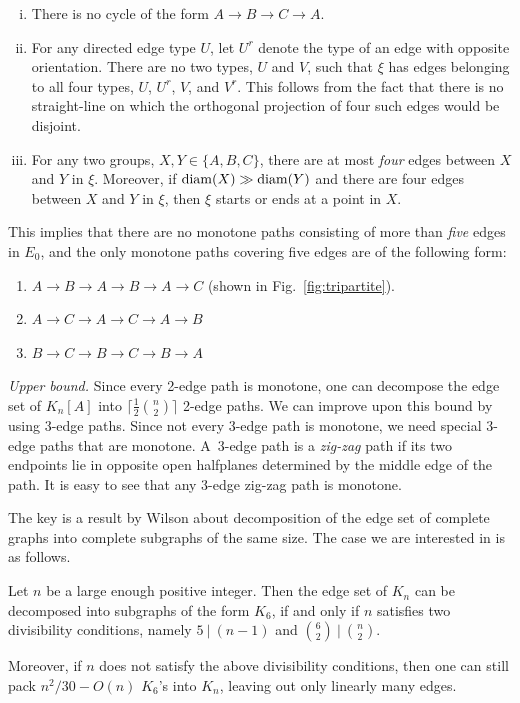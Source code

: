 \documentclass[a4paper,USenglish]{lipics-v2021}
\newcommand{\diam}{{\rm diam}}
\begin{document}
\begin{enumerate} [(i)]  \itemsep 2pt
\item There is no cycle of the form $A \to B \to C \to A$.
\item For any directed edge type $U$, let $U^r$ denote the type of an edge with opposite orientation.
  There are no two types, $U$ and $V$, such that
  $\xi$ has edges belonging to all four types, $U$, $U^r$, $V$, and $V^r$.
  This follows from the fact that there is no straight-line on which the orthogonal projection
  of four such edges would be disjoint. 
  \item For any two groups, $X,Y \in \{A,B,C\}$, there are at most \emph{four} edges 
    between $X$ and $Y$ in $\xi$. Moreover, if $\diam(X) \gg \diam(Y)$
    and there are four edges between $X$ and $Y$ in $\xi$, then $\xi$ starts or ends at
    a point in $X$.  
\end{enumerate}

This implies that there are no monotone paths consisting of more than \emph{five} edges in $E_0$,
and the only monotone paths covering five edges are of the following form:

\begin{enumerate} \itemsep 2pt
\item $A \to B \to A \to B \to A \to C$ (shown in Fig.~\ref{fig:tripartite}). 
\item $A \to C \to A \to C \to A \to B$
\item $B \to C \to B \to C \to B \to A$
\end{enumerate}



\medskip
\emph{Upper bound.}
Since every 2-edge path is monotone, one can decompose the edge set of $K_n[A]$ into
$\lceil \frac12 \binom{n}{2} \rceil$ 2-edge paths.
We can improve upon this bound by using $3$-edge paths. Since not every $3$-edge path is monotone,
we need special $3$-edge paths that are monotone.   
A~$3$-edge path is a \emph{zig-zag} path if its two endpoints lie in opposite open halfplanes
determined by the middle edge of the path. It is easy to see that any $3$-edge zig-zag path
is monotone.

The key is a result by Wilson \cite{Wil75} about decomposition of the edge set of complete graphs
into complete subgraphs of the same size. The case we are interested in is as follows.

\begin{lemma}[Wilson 1975]
  Let $n$ be a large enough positive integer. Then the edge set of $K_n$ can be decomposed into subgraphs
  of the form $K_6$, if and only if $n$ satisfies two divisibility conditions,
  namely $5\ |\ (n-1)$ and $\binom{6}{2} \ | \ \binom{n}{2}$.
  
  Moreover, if $n$ does not satisfy the above divisibility conditions, then one can still pack
  $n^2/30 - O(n)$ $K_6$'s into $K_n$, leaving out only linearly many edges. 
\end{lemma}
\end{document}
